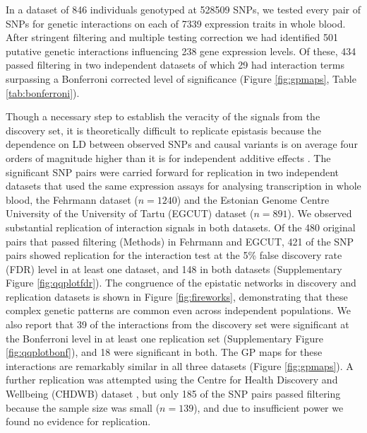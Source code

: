 \documentclass{article}
\begin{document}
In a dataset of 846 individuals genotyped at 528509 SNPs, we tested every pair of SNPs for genetic interactions on each of 7339 expression traits in whole blood. After stringent filtering and multiple testing correction we had identified 501 putative genetic interactions influencing 238 gene expression levels. Of these, 434 passed filtering in two independent datasets of which 29 had interaction terms surpassing a Bonferroni corrected level of significance (Figure \ref{fig:gpmaps}, Table \ref{tab:bonferroni}).

Though a necessary step to establish the veracity of the signals from the discovery set, it is theoretically difficult to replicate epistasis because the dependence on LD between observed SNPs and causal variants is on average four orders of magnitude higher than it is for independent additive effects \cite{Weir2008, Hemani2013}. The significant SNP pairs were carried forward for replication in two independent datasets that used the same expression assays for analysing transcription in whole blood, the Fehrmann dataset \cite{Fehrmann2011} ($n=1240$) and the Estonian Genome Centre University of the University of Tartu (EGCUT) dataset \cite{Metspalu2004} ($n=891$). We observed substantial replication of interaction signals in both datasets. Of the 480 original pairs that passed filtering (Methods) in Fehrmann and EGCUT, 421 of the SNP pairs showed replication for the interaction test at the 5\% false discovery rate (FDR) level in at least one dataset, and 148 in both datasets (Supplementary Figure \ref{fig:qqplotfdr}). The congruence of the epistatic networks in discovery and replication datasets is shown in Figure \ref{fig:fireworks}, demonstrating that these complex genetic patterns are common even across independent populations. We also report that 39 of the interactions from the discovery set were significant at the Bonferroni level in at least one replication set (Supplementary Figure \ref{fig:qqplotbonf}), and 18 were significant in both. The GP maps for these interactions are remarkably similar in all three datasets (Figure \ref{fig:gpmaps}). A further replication was attempted using the Centre for Health Discovery and Wellbeing (CHDWB) dataset \cite{Preininger2013}, but only 185 of the SNP pairs passed filtering because the sample size was small ($n=139$), and due to insufficient power we found no evidence for replication.
\end{document}
